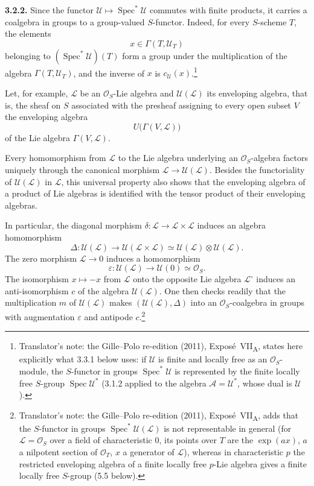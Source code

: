 \medskip
\noindent\textbf{3.2.2.}
\label{sga3:VIIA:3.2.2}
Since the functor
\(\mathcal U\mapsto\operatorname{Spec}^{*}\mathcal U\) commutes
with finite products, it carries a coalgebra in groups to a
group-valued \(S\)-functor. Indeed, for every \(S\)-scheme \(T\),
the elements
\[
  x\in\Gamma(T,\mathcal U_T)
\]
belonging to
\((\operatorname{Spec}^{*}\mathcal U)(T)\) form a group under the
multiplication of the algebra \(\Gamma(T,\mathcal U_T)\), and the
inverse of \(x\) is \(c_{\mathcal U}(x)\).\footnote{Translator's note: the
Gille--Polo re-edition (2011), Expos\'e~VII\textsubscript{A}, states
here explicitly what 3.3.1 below uses: if \(\mathcal U\) is finite and
locally free as an \(\mathcal O_S\)-module, the \(S\)-functor in groups
\(\operatorname{Spec}^{*}\mathcal U\) is represented by the finite locally
free \(S\)-group \(\operatorname{Spec}\mathcal U^{*}\) (3.1.2 applied to
the algebra \(\mathcal A=\mathcal U^{*}\), whose dual is
\(\mathcal U\)).}

Let, for example, \(\mathcal L\) be an \(\mathcal O_S\)-Lie algebra and
\(\mathcal U(\mathcal L)\) its enveloping algebra, that is, the
sheaf on \(S\) associated with the presheaf assigning to every open
subset \(V\) the enveloping algebra
\[
  U\bigl(\Gamma(V,\mathcal L)\bigr)
\]
of the Lie algebra \(\Gamma(V,\mathcal L)\).

Every homomorphism from \(\mathcal L\) to the Lie algebra underlying
an \(\mathcal O_S\)-algebra factors uniquely through
the canonical morphism
\(\mathcal L\to\mathcal U(\mathcal L)\). Besides the functoriality
of \(\mathcal U(\mathcal L)\) in \(\mathcal L\), this universal
property also shows that the enveloping algebra of a product of Lie
algebras is identified with the tensor product of their enveloping
algebras.

In particular, the diagonal morphism
\(\delta:\mathcal L\to\mathcal L\times\mathcal L\) induces an
algebra homomorphism
\[
  \Delta:\mathcal U(\mathcal L)\longrightarrow
  \mathcal U(\mathcal L\times\mathcal L)
  \simeq
  \mathcal U(\mathcal L)\otimes\mathcal U(\mathcal L).
\]
The zero morphism \(\mathcal L\to0\) induces a homomorphism
\[
  \varepsilon:\mathcal U(\mathcal L)\longrightarrow
  \mathcal U(0)\simeq\mathcal O_S.
\]
The isomorphism \(x\mapsto-x\) from \(\mathcal L\) onto the opposite
Lie algebra \(\mathcal L^{\circ}\) induces an anti-isomorphism \(c\)
of the algebra \(\mathcal U(\mathcal L)\). One then checks readily
that the multiplication \(m\) of \(\mathcal U(\mathcal L)\) makes
\((\mathcal U(\mathcal L),\Delta)\) into an
\(\mathcal O_S\)-coalgebra in groups with augmentation
\(\varepsilon\) and antipode \(c\).\footnote{Translator's note: the
Gille--Polo re-edition (2011), Expos\'e~VII\textsubscript{A}, adds that
the \(S\)-functor in groups \(\operatorname{Spec}^{*}\mathcal U(\mathcal L)\)
is not representable in general (for \(\mathcal L=\mathcal O_S\) over a
field of characteristic \(0\), its points over \(T\) are the
\(\exp(ax)\), \(a\) a nilpotent section of \(\mathcal O_T\), \(x\) a
generator of \(\mathcal L\)), whereas in characteristic \(p\) the
restricted enveloping algebra of a finite locally free \(p\)-Lie algebra
gives a finite locally free \(S\)-group (5.5 below).}

